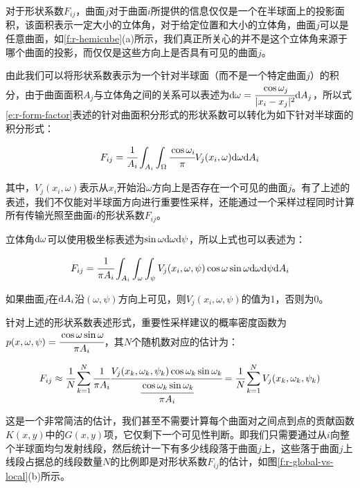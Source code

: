 对于形状系数$F_{ij}$，曲面$j$对于曲面$i$所提供的信息仅仅是一个在半球面上的投影面积，该面积表示一定大小的立体角，对于给定位置和大小的立体角，曲面$j$可以是任意曲面，如\ref{f:r-hemicube}(a)所示，我们真正所关心的并不是这个立体角来源于哪个曲面的投影，而仅仅是这些方向上是否具有可见的曲面$j$。

由此我们可以将形状系数表示为一个针对半球面（而不是一个特定曲面$j$）的积分，由于曲面面积$A_j$与立体角之间的关系可以表述为${\rm d}\omega= \cfrac{\cos{\omega}_j}{|x_i-x_j|^{2}}{\rm d}A_j$，所以式\ref{e:r-form-factor}表述的针对曲面积分形式的形状系数可以转化为如下针对半球面的积分形式：

\begin{equation}
	F_{ij}= \cfrac{1}{A_i}\int_{A_i}\int_{\Omega} \cfrac{\cos{\omega}_i}{\pi}V_j(x_i,\omega){\rm d}\omega {\rm d}A_i
\end{equation}

\noindent 其中，$V_j(x_i,\omega)$表示从$x_i$开始沿$\omega$方向上是否存在一个可见的曲面$j$。有了上述的表述，我们不仅能对半球面方向进行重要性采样，还能通过一个采样过程同时计算所有传输光照至曲面$i$的形状系数$F_{ij}$。

立体角${\rm d}\omega$可以使用极坐标表述为$\sin{\omega} {\rm d}{\omega} {\rm d}\psi$，所以上式也可以表述为：

\begin{equation}\label{e:r-form-factor-over-hemisphere}
	F_{ij}= \cfrac{1}{\pi A_i}\int_{A_i}\int_{{\omega}}\int_{\psi}V_j(x_i,{\omega},\psi)\cos{\omega}\sin{\omega} {\rm d}{\omega} {\rm d}\psi {\rm d}A_i
\end{equation}

\noindent 如果曲面$j$在${\rm d}A_i$沿$({\omega},\psi)$方向上可见，则$V_j(x_i,{\omega},\psi)$的值为1，否则为0。

针对上述的形状系数表述形式，重要性采样建议的概率密度函数为$p(x,{\omega},\psi)= \cfrac{\cos{\omega}\sin{\omega}}{\pi A_i}$，其$N$个随机数对应的估计为：

\begin{equation}
	F_{ij}\approx \cfrac{1}{N}\sum^{N}_{k=1} \cfrac{1}{\pi A_i} \cfrac{V_j(x_k,{\omega}_k,\psi_k)\cos{\omega}_k\sin{\omega}_k}{ \cfrac{\cos{\omega}_k\sin{\omega}_k}{\pi A_i}}= \cfrac{1}{N}\sum^{N}_{k=1}V_j(x_k,{\omega}_k,\psi_k)
\end{equation}

这是一个非常简洁的估计，我们甚至不需要计算每个曲面对之间点到点的贡献函数$K(x,y)$中的$G(x,y)$项，它仅剩下一个可见性判断。即我们只需要通过从$i$向整个半球面均匀发射线段，然后统计一下有多少线段落于曲面$j$上，这些落于曲面$j$上线段占据总的线段数量$N$的比例即是对形状系数$F_{ij}$的估计，如图\ref{f:r-global-vs-local}(b)所示。

